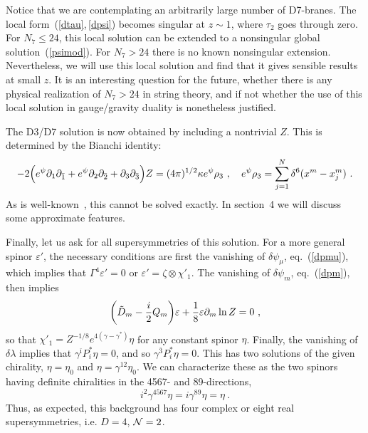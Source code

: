 \documentclass[a4paper,12pt]{article}
\renewcommand{\i}{\imath}
\newcommand{\bi}{{\bar\i}}
\renewcommand{\=}[1]{\bar{#1}}
\begin{document}
Notice that we are contemplating an arbitrarily large number of D7-branes.  The
local form~(\ref{dtau},\,\ref{dpsi}) becomes singular at $z \sim 1$, where
$\tau_2$
goes through zero.  For $N_7 \leq 24$, this  local solution can be
extended to a nonsingular global solution~(\ref{psimod}).  For $N_7 > 24$ there
is no known nonsingular extension.  Nevertheless, we will use this local
solution and find that it gives sensible results at small $z$.  It is an
interesting question for the future, whether there is any physical realization
of $N_7 > 24$ in string theory, and if not whether the use of this local
solution
in gauge/gravity duality is nonetheless justified.


The D3/D7 solution is now obtained by including a nontrivial $Z$.  This is
determined by the Bianchi identity:
\begin{equation}
- 2\Bigl(e^{\psi} \partial_1
\partial_{\bar{1}}+e^{\psi} \partial_2 \partial_{\bar{2}}+
\partial_3 \partial_{\bar{3}} \Bigr) Z =
(4\pi)^{1/2} \kappa e^{\psi} \rho_3\ ,\quad e^{\psi} \rho_3 =
\sum_{j=1}^N
 \delta^6(x^m - x^m_j) \ .
\label{eqZsources}
\end{equation}
As is well-known~\cite{intersect}, this cannot be solved exactly.  In
section~4 we
will discuss some approximate features.

Finally, let us ask for all supersymmetries of this solution.  For a more
general
spinor $\varepsilon'$, the necessary conditions are first the vanishing of
$\delta\psi_\mu$, eq.~(\ref{dpmu}), which implies that $\Gamma^4 \varepsilon' = 
0$
or $\varepsilon' = \zeta \otimes \chi'_1$.  The vanishing of
$\delta\psi_m$, eq.~(\ref{dpm}), then implies
\begin{equation}
\biggl(\tilde D_{m} -{i\over2} Q_m \biggr) \varepsilon
+ \frac{1}{8}\varepsilon
\partial_m \ln Z =0\ ,
\end{equation}
so that $\chi'_1 = Z^{-1/8} e^{4(\gamma - \gamma^*)} \eta$ for any constant spinor
$\eta$. Finally, the vanishing of $\delta\lambda$ implies that $\gamma^{\bi} P^*_i
\eta =
0$, and so $\gamma^{\bar 3} P^*_i \eta = 0$.  This has two solutions of the
given
chirality, $\eta = \eta_0$ and $\eta = \gamma^{12} \eta_0$.
We can characterize these as the two spinors having definite chiralities in the
4567- and 89-directions,
\begin{equation}
i^2 \gamma^{4567} \eta = i \gamma^{89} \eta = \eta\ .   \label{chir}
\end{equation}
Thus,
as expected, this background has four complex or eight real
supersymmetries, i.e.
$D=4$, ${\cal N}=2$.
\end{document}
